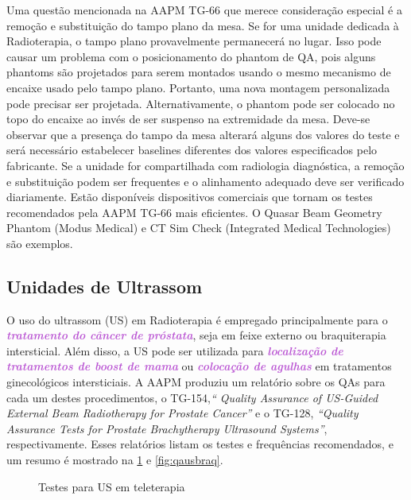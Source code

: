 \documentclass[11pt,a4paper]{article}
\newcounter{exemplo}
\begin{document}
	Uma questão mencionada na AAPM TG-66 que merece consideração especial é a remoção e substituição do tampo plano da mesa. Se for uma unidade dedicada à Radioterapia, o tampo plano provavelmente permanecerá no lugar. Isso pode causar um problema com o posicionamento do phantom de QA, pois alguns phantoms são projetados para serem montados usando o mesmo mecanismo de encaixe usado pelo tampo plano. Portanto, uma nova montagem personalizada pode precisar ser projetada. Alternativamente, o phantom pode ser colocado no topo do encaixe ao invés de ser suspenso na extremidade da mesa. Deve-se observar que a presença do tampo da mesa alterará alguns dos valores do teste e será necessário estabelecer baselines diferentes dos valores especificados pelo fabricante. Se a unidade for compartilhada com radiologia diagnóstica, a remoção e substituição podem ser frequentes e o alinhamento adequado deve ser verificado diariamente. Estão disponíveis dispositivos comerciais que tornam os testes recomendados pela AAPM TG-66 mais eficientes. O Quasar Beam Geometry Phantom (Modus Medical) e CT Sim Check (Integrated Medical Technologies) são exemplos.

\subsection*{Unidades de Ultrassom}

	O uso do ultrassom (US) em Radioterapia é empregado principalmente para o \textcolor{MediumOrchid}{\textbf{\textit{tratamento do câncer de próstata}}}, seja em feixe externo ou braquiterapia intersticial. Além disso, a US pode ser utilizada para \textcolor{MediumOrchid}{\textbf{\textit{localização de tratamentos de boost de mama}}} ou \textcolor{MediumOrchid}{\textbf{\textit{colocação de agulhas}}} em tratamentos ginecológicos intersticiais. A AAPM produziu um relatório sobre os QAs para cada um destes procedimentos, o TG-154,\textit{`` Quality Assurance of US-Guided External Beam Radiotherapy for Prostate Cancer''} e o TG-128,  \textit{``Quality Assurance Tests for Prostate Brachytherapy Ultrasound Systems''}, respectivamente. Esses relatórios listam os testes e frequências recomendados, e um resumo é mostrado na \ref{fig:qaustele} e \ref{fig:qausbraq}.


	\begin{figure}[!h]
		\centering
		\caption{Testes para US em teleterapia}
		\label{fig:qaustele}
	\end{figure}
\end{document}
